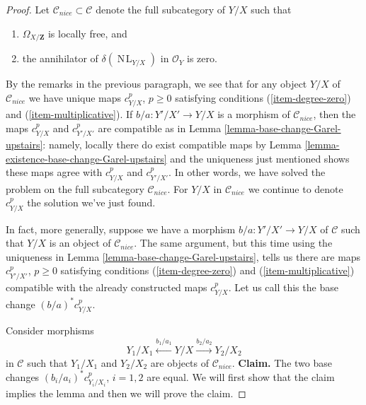 \documentclass{amsart}
\theoremstyle{plain}
\theoremstyle{definition}
\theoremstyle{remark}
\numberwithin{equation}{subsection}
\def\NL{\mathop{N\!L}\nolimits}
\begin{document}
\begin{proof}
\medskip\noindent
Let $\mathcal{C}_{nice} \subset \mathcal{C}$ denote the full subcategory
of $Y/X$ such that
\begin{enumerate}
\item $\Omega_{X/\mathbf{Z}}$ is locally free, and
\item the annihilator of $\delta(\NL_{Y/X})$ in $\mathcal{O}_Y$ is zero.
\end{enumerate}
By the remarks in the previous paragraph, we see that for any
object $Y/X$ of $\mathcal{C}_{nice}$ we have unique maps
$c^p_{Y/X}$, $p \geq 0$ satisfying conditions (\ref{item-degree-zero})
and (\ref{item-multiplicative}). If $b/a : Y'/X' \to Y/X$
is a morphism of $\mathcal{C}_{nice}$, then the maps
$c^p_{Y/X}$ and $c^p_{Y'/X'}$ are compatible as in
Lemma \ref{lemma-base-change-Garel-upstairs}: namely,
locally there do exist compatible maps by
Lemma \ref{lemma-existence-base-change-Garel-upstairs}
and the uniqueness just mentioned shows these maps agree
with $c^p_{Y/X}$ and $c^p_{Y'/X'}$.
In other words, we have solved the problem
on the full subcategory $\mathcal{C}_{nice}$. For $Y/X$ in $\mathcal{C}_{nice}$
we continue to denote $c^p_{Y/X}$ the solution we've just found.

\medskip\noindent
In fact, more generally, suppose we have a morphism $b/a : Y'/X' \to Y/X$
of $\mathcal{C}$ such that $Y/X$ is an object of $\mathcal{C}_{nice}$.
The same argument, but this time using the uniqueness in
Lemma \ref{lemma-base-change-Garel-upstairs}, tells us there are
maps $c^p_{Y'/X'}$, $p \geq 0$  satisfying conditions (\ref{item-degree-zero})
and (\ref{item-multiplicative}) compatible with the already constructed
maps $c^p_{Y/X}$. Let us call this the base change
$(b/a)^*c^p_{Y/X}$.

\medskip\noindent
Consider morphisms
$$
Y_1/X_1 \xleftarrow{b_1/a_1} Y/X \xrightarrow{b_2/a_2} Y_2/X_2
$$
in $\mathcal{C}$ such that $Y_1/X_1$ and $Y_2/X_2$ are objects
of $\mathcal{C}_{nice}$.
{\bf Claim.} The two base changes $(b_i/a_i)^*c^p_{Y_i/X_i}$, $i = 1, 2$
are equal. We will first show that the claim implies the lemma
and then we will prove the claim.


\end{proof}
\end{document}
